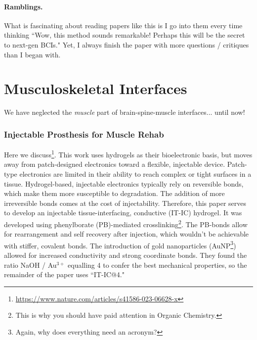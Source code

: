 \subsubsection{Ramblings.}

What is fascinating about reading papers like this is I go into them every time thinking ``Wow, this method sounds remarkable! Perhaps this will be the secret to next-gen BCIs." Yet, I always finish the paper with more questions / critiques than I began with. 





\chapter{Musculoskeletal Interfaces}

We have neglected the \textit{muscle} part of brain-spine-muscle interfaces... until now! 

\subsection{Injectable Prosthesis for Muscle Rehab}

Here we discuss\footnote{\url{https://www.nature.com/articles/s41586-023-06628-x}}. This work uses hydrogels as their bioelectronic basis, but moves away from patch-designed electronics toward a flexible, injectable device. Patch-type electronics are limited in their ability to reach complex or tight surfaces in a tissue. Hydrogel-based, injectable electronics typically rely on reversible bonds, which make them more susceptible to degradation. The addition of more irreversible bonds comes at the cost of injectability. Therefore, this paper serves to develop an injectable tissue-interfacing, conductive  (IT-IC) hydrogel. It was developed using phenylborate (PB)-mediated crosslinking\footnote{This is why you should have paid attention in Organic Chemistry.}. The PB-bonds allow for rearrangement and self recovery after injection, which wouldn't be achievable with stiffer, covalent bonds. The introduction of gold nanoparticles (AuNP\footnote{Again, why does everything need an acronym?}) allowed for increased conductivity and strong coordinate bonds. They found the ratio NaOH / Au$^{3+}$ equalling 4 to confer the best mechanical properties, so the remainder of the paper uses ``IT-IC@4."\newline

